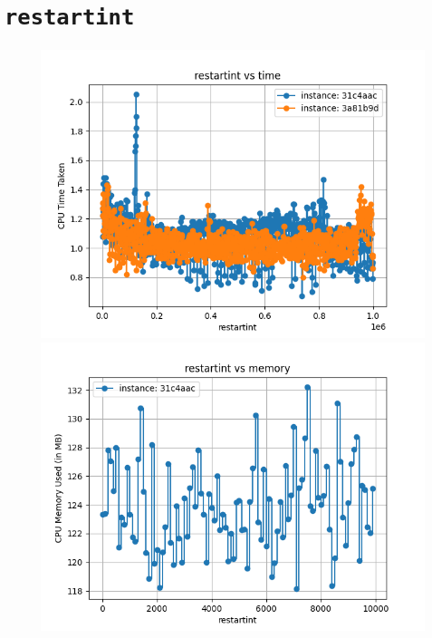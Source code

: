 \documentclass{article}
\begin{document}
    \section*{\texttt{restartint}}
    \begin{figure}[H]
        \centering
        \begin{minipage}{0.45\textwidth}
            \centering
            \includegraphics[width = \linewidth]{restartint-0.png}
        \end{minipage}
        \hfill
        \begin{minipage}{0.45\textwidth}
            \centering
            \includegraphics[width = \linewidth]{restartint-1.png}
        \end{minipage}
    \end{figure}
\end{document}
